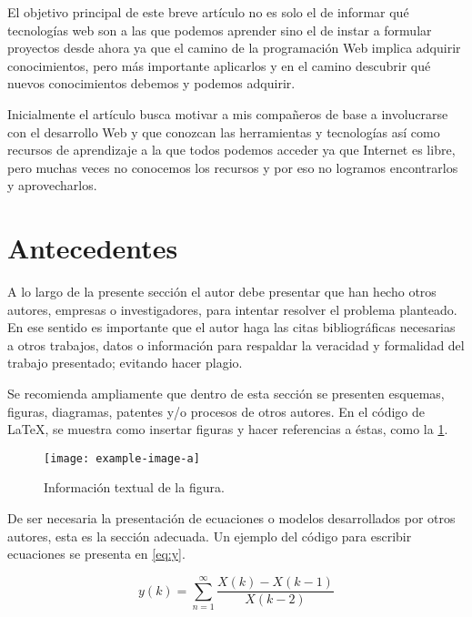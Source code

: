 \documentclass[a4paper, twocolumns]{IEEEtran}
\begin{document}
El objetivo principal de este breve artículo no es solo el de informar qué
tecnologías web son a las que podemos aprender sino el de instar a formular
proyectos desde ahora ya que el camino de la programación Web implica adquirir
conocimientos, pero más importante aplicarlos y en el camino descubrir qué
nuevos conocimientos debemos y podemos adquirir.

Inicialmente el artículo busca motivar a mis compañeros de base a involucrarse
con el desarrollo Web y que conozcan las herramientas y tecnologías así como
recursos de aprendizaje a la que todos podemos acceder ya que Internet es
libre, pero muchas veces no conocemos los recursos y por eso no logramos
encontrarlos y aprovecharlos.

\section{Antecedentes}

A lo largo de la presente sección el autor debe presentar que han hecho otros
autores, empresas o investigadores, para intentar resolver el problema
planteado. En ese sentido es importante que el autor haga las citas
bibliográficas necesarias a otros trabajos, datos o información para respaldar
la veracidad y formalidad del trabajo presentado; evitando hacer
plagio\cite{ChavezCampos2016}\cite{pascual199012}.

Se recomienda ampliamente que dentro de esta sección se presenten esquemas,
figuras, diagramas, patentes y/o procesos de otros autores. En el código de
\LaTeX{}, se muestra como insertar figuras y hacer referencias a éstas, como la
\figurename{} \ref{ref:FiguraA}. 


\begin{figure}[ht]
   \centering
   \texttt{[image: example-image-a]}
   \caption{Información textual de la figura.}\label{ref:FiguraA}
\end{figure}

De ser necesaria la presentación de ecuaciones o modelos desarrollados por
otros autores, esta es la sección adecuada. Un ejemplo del código para escribir
ecuaciones se presenta en \eqref{eq:y}.

\begin{equation}
   y(k)=\sum_{n=1}^{\infty}\frac{X(k)-X(k-1)}{X(k-2)}\label{eq:y}
\end{equation}
\end{document}
